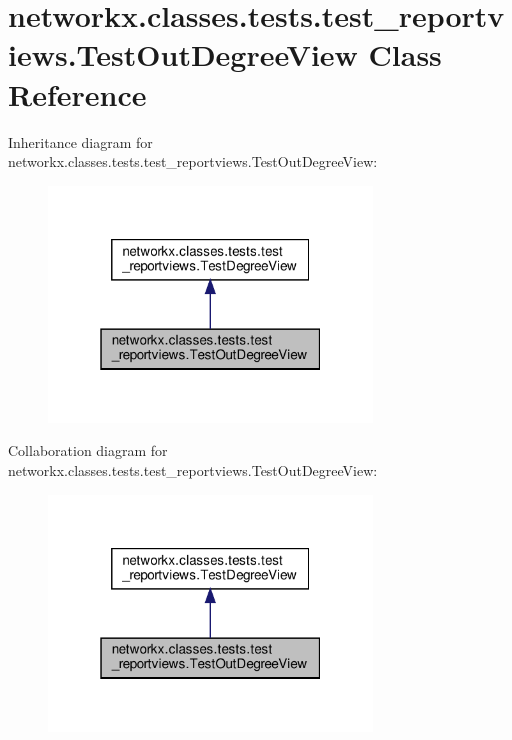 \hypertarget{classnetworkx_1_1classes_1_1tests_1_1test__reportviews_1_1TestOutDegreeView}{}\section{networkx.\+classes.\+tests.\+test\+\_\+reportviews.\+Test\+Out\+Degree\+View Class Reference}
\label{classnetworkx_1_1classes_1_1tests_1_1test__reportviews_1_1TestOutDegreeView}


Inheritance diagram for networkx.\+classes.\+tests.\+test\+\_\+reportviews.\+Test\+Out\+Degree\+View\+:
\nopagebreak
\begin{figure}[H]
\begin{center}
\leavevmode
\includegraphics[width=244pt]{classnetworkx_1_1classes_1_1tests_1_1test__reportviews_1_1TestOutDegreeView__inherit__graph}
\end{center}
\end{figure}


Collaboration diagram for networkx.\+classes.\+tests.\+test\+\_\+reportviews.\+Test\+Out\+Degree\+View\+:
\nopagebreak
\begin{figure}[H]
\begin{center}
\leavevmode
\includegraphics[width=244pt]{classnetworkx_1_1classes_1_1tests_1_1test__reportviews_1_1TestOutDegreeView__coll__graph}
\end{center}
\end{figure}
